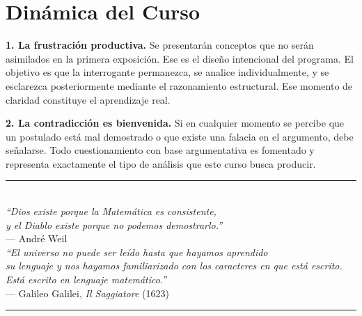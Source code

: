 \documentclass[11pt, letterpaper]{article}
\begin{document}
\tableofcontents
\newpage

\section*{Dinámica del Curso}



\textbf{1. La frustraci\'on productiva.}
Se presentar\'an conceptos que no ser\'an asimilados en la primera exposici\'on. Ese es el dise\~no intencional del programa. El objetivo es que la interrogante permanezca, se analice individualmente, y se esclarezca posteriormente mediante el razonamiento estructural. Ese momento de claridad constituye el aprendizaje real.

\textbf{2. La contradicci\'on es bienvenida.}
Si en cualquier momento se percibe que un postulado est\'a mal demostrado o que existe una falacia en el argumento, debe se\~nalarse. Todo cuestionamiento con base argumentativa es fomentado y representa exactamente el tipo de an\'alisis que este curso busca producir.


\vspace{2cm}

\begin{center}
\textcolor{mitred}{\rule{0.5\linewidth}{0.6pt}}\\[0.4em]
{\small\itshape ``Dios existe porque la Matem\'atica es consistente,\\
y el Diablo existe porque no podemos demostrarlo.''}\\[0.3em]
{\footnotesize --- Andr\'e Weil}\\[0.8em]
{\small\itshape ``El universo no puede ser le\'ido hasta que hayamos aprendido\\
su lenguaje y nos hayamos familiarizado con los caracteres en que est\'a escrito.\\
Est\'a escrito en lenguaje matem\'atico.''}\\[0.3em]
{\footnotesize --- Galileo Galilei, \textit{Il Saggiatore} (1623)}\\
\textcolor{mitred}{\rule{0.5\linewidth}{0.6pt}}
\end{center}


\newpage
\end{document}
